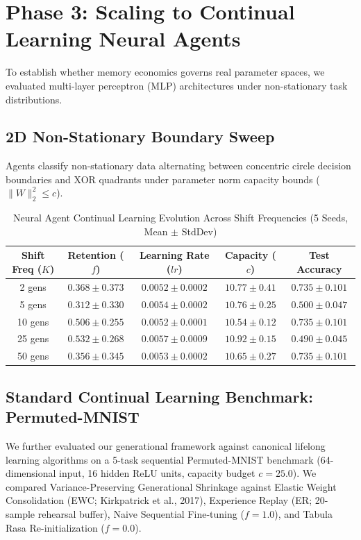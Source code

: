 \documentclass[11pt,a4paper]{article}
\begin{document}
\section{Phase 3: Scaling to Continual Learning Neural Agents}
To establish whether memory economics governs real parameter spaces, we evaluated multi-layer perceptron (MLP) architectures under non-stationary task distributions.

\subsection{2D Non-Stationary Boundary Sweep}
Agents classify non-stationary data alternating between concentric circle decision boundaries and XOR quadrants under parameter norm capacity bounds ($\|W\|_2^2 \le c$).

\begin{table}[h]
\centering
\caption{Neural Agent Continual Learning Evolution Across Shift Frequencies (5 Seeds, Mean $\pm$ StdDev)}
\label{tab:neural_results}
\vspace{0.2cm}
\begin{tabular}{ccccc}
\toprule
\textbf{Shift Freq ($K$)} & \textbf{Retention ($f$)} & \textbf{Learning Rate ($lr$)} & \textbf{Capacity ($c$)} & \textbf{Test Accuracy} \\
\midrule
2 gens  & $0.368 \pm 0.373$ & $0.0052 \pm 0.0002$ & $10.77 \pm 0.41$ & $0.735 \pm 0.101$ \\
5 gens  & $0.312 \pm 0.330$ & $0.0054 \pm 0.0002$ & $10.76 \pm 0.25$ & $0.500 \pm 0.047$ \\
10 gens & $0.506 \pm 0.255$ & $0.0052 \pm 0.0001$ & $10.54 \pm 0.12$ & $0.735 \pm 0.101$ \\
25 gens & $0.532 \pm 0.268$ & $0.0057 \pm 0.0009$ & $10.92 \pm 0.15$ & $0.490 \pm 0.045$ \\
50 gens & $0.356 \pm 0.345$ & $0.0053 \pm 0.0002$ & $10.65 \pm 0.27$ & $0.735 \pm 0.101$ \\
\bottomrule
\end{tabular}
\end{table}

\subsection{Standard Continual Learning Benchmark: Permuted-MNIST}
We further evaluated our generational framework against canonical lifelong learning algorithms on a 5-task sequential Permuted-MNIST benchmark (64-dimensional input, 16 hidden ReLU units, capacity budget $c=25.0$). We compared Variance-Preserving Generational Shrinkage against Elastic Weight Consolidation (EWC; Kirkpatrick et al., 2017), Experience Replay (ER; 20-sample rehearsal buffer), Naive Sequential Fine-tuning ($f=1.0$), and Tabula Rasa Re-initialization ($f=0.0$).
\end{document}
